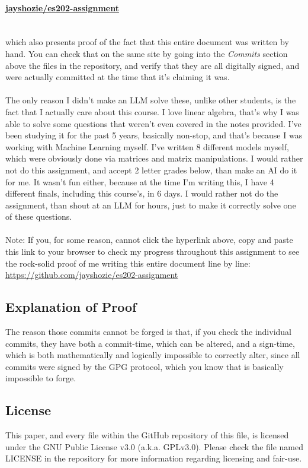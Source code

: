 \documentclass{article}
\begin{document}
\paragraph*{
    \href{https://github.com/jayshozie/es202-assignment}{jayshozie/es202-assignment}
    \\
    \\
}
which also presents proof of the fact that this entire document was written by
hand. You can check that on the same site by going into the \textit{Commits}
section above the files in the repository, and verify that they are all
digitally signed, and were actually committed at the time that it's claiming it
was.
\\
\\
The only reason I didn't make an LLM solve these, unlike other students, is the
fact that I actually care about this course. I love linear algebra, that's why I
was able to solve some questions that weren't even covered in the notes
provided. I've been studying it for the past 5 years, basically non-stop, and
that's because I was working with Machine Learning myself. I've written 8
different models myself, which were obviously done via matrices and matrix
manipulations. I would rather not do this assignment, and accept 2 letter grades
below, than make an AI do it for me. It wasn't fun either, because at the time
I'm writing this, I have 4 different finals, including this course's, in 6 days.
I would rather not do the assignment, than shout at an LLM for hours, just to
make it correctly solve one of these questions.
\\
\\
{\footnotesize{
    Note: If you, for some reason, cannot click the hyperlink above, copy and
    paste this link to your browser to check my progress throughout this assignment
    to see the rock-solid proof of me writing this entire document line by line:
    \href{https://github.com/jayshozie/es202-assignment}{https://github.com/jayshozie/es202-assignment}
}}
\subsection{Explanation of Proof}
The reason those commits cannot be forged is that, if you check the individual
commits, they have both a commit-time, which can be altered, and a sign-time,
which is both mathematically and logically impossible to correctly alter, since
all commits were signed by the GPG protocol, which you know that is basically
impossible to forge.
\subsection{License}
This paper, and every file within the GitHub repository of this file, is
licensed under the GNU Public License v3.0 (a.k.a. GPLv3.0). Please check the
file named LICENSE in the repository for more information regarding licensing
and fair-use.
\end{document}
